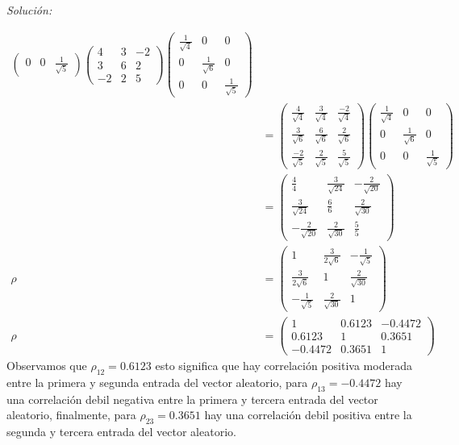 \documentclass[12pt]{article}
\newenvironment{sol}
    {\emph{Solución:}
    }
    {
    }
\begin{document}
\begin{sol}
\begin{align*}
\begin{pmatrix}
 0 & 0 & \frac{1}{\sqrt{5}}
\end{pmatrix}
\begin{pmatrix}
4&3&-2\\
3&6&2\\
-2&2&5
\end{pmatrix}
\begin{pmatrix}
\frac{1}{\sqrt{4}} & 0 & 0 \\
0 &\frac{1}{\sqrt{6}} & 0 \\
 0 & 0 & \frac{1}{\sqrt{5}}
\end{pmatrix}\\
&= \begin{pmatrix}
\frac{4}{\sqrt{4}} & \frac{3}{\sqrt{4}} & \frac{-2}{\sqrt{4}} \\
\frac{3}{\sqrt{6}} & \frac{6}{\sqrt{6}} & \frac{2}{\sqrt{6}} \\
\frac{-2}{\sqrt{5}} & \frac{2}{\sqrt{5}} & \frac{5}{\sqrt{5}}
\end{pmatrix}
\begin{pmatrix}
\frac{1}{\sqrt{4}} & 0 & 0 \\
0 &\frac{1}{\sqrt{6}} & 0 \\
 0 & 0 & \frac{1}{\sqrt{5}}
\end{pmatrix}\\
&= \begin{pmatrix}
\frac{4}{4} & \frac{3}{\sqrt{24}} & -\frac{2}{\sqrt{20}} \\
\frac{3}{\sqrt{24}} & \frac{6}{6} & \frac{2}{\sqrt{30}} \\
-\frac{2}{\sqrt{20}} & \frac{2}{\sqrt{30}} & \frac{5}{5}
\end{pmatrix}\\
\rho &= \begin{pmatrix}
1 & \frac{3}{2\sqrt{6}} & -\frac{1}{\sqrt{5}} \\
\frac{3}{2\sqrt{6}} & 1 & \frac{2}{\sqrt{30}} \\
-\frac{1}{\sqrt{5}} & \frac{2}{\sqrt{30}} & 1
\end{pmatrix}\\
\rho &= 
\begin{pmatrix}
1 & 0.6123 & -0.4472 \\
0.6123 & 1 & 0.3651 \\
-0.4472 &  0.3651 & 1
\end{pmatrix}
\end{align*}
Observamos que $\rho_{12} = 0.6123$ esto significa que hay correlación positiva moderada entre la primera y segunda entrada del vector aleatorio, para $\rho_{13} = -0.4472$ hay una correlación debil negativa entre la primera y tercera entrada del vector aleatorio, finalmente, para $\rho_{23} = 0.3651$ hay una correlación debil positiva entre la segunda y tercera entrada del vector aleatorio.\\\\

\end{sol}
\end{document}
